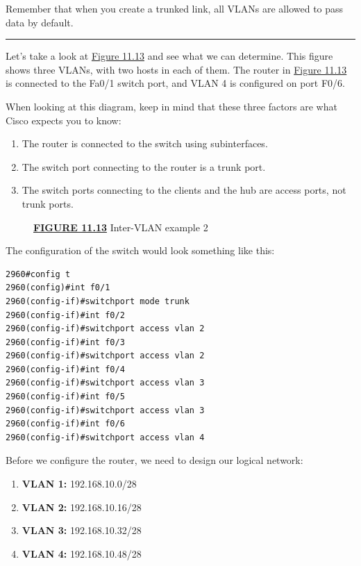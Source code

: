 \documentclass[b5paper,11pt]{memoir}
\begin{document}
Remember that when you create a trunked
link, all VLANs are allowed to pass data by default.

\begin{center}\rule{0.5\linewidth}{0.5pt}\end{center}

Let's take a look at
\protect\hyperlink{c11.xhtmlux5cux23figure11-13}{Figure 11.13} and see
what we can determine. This figure shows three VLANs, with two hosts in
each of them. The router in
\protect\hyperlink{c11.xhtmlux5cux23figure11-13}{Figure 11.13} is
connected to the Fa0/1 switch port, and VLAN 4 is configured on port
F0/6.

When looking at this diagram, keep in mind that these three factors are
what Cisco expects you to know:

\begin{enumerate}
\tightlist
\item
  The router is connected to the switch using subinterfaces.
\item
  The switch port connecting to the router is a trunk port.
\item
  The switch ports connecting to the clients and the hub are access
  ports, not trunk ports.
\end{enumerate}

\begin{figure}
\centering
\caption{{\protect\hyperlink{c11.xhtmlux5cux23figureanchor11-13}{\textbf{FIGURE
11.13}} Inter-VLAN example 2}}
\end{figure}

The configuration of the switch would look something like this:

\begin{verbatim}
2960#config t
2960(config)#int f0/1
2960(config-if)#switchport mode trunk
2960(config-if)#int f0/2
2960(config-if)#switchport access vlan 2
2960(config-if)#int f0/3
2960(config-if)#switchport access vlan 2
2960(config-if)#int f0/4
2960(config-if)#switchport access vlan 3
2960(config-if)#int f0/5
2960(config-if)#switchport access vlan 3
2960(config-if)#int f0/6
2960(config-if)#switchport access vlan 4
\end{verbatim}

Before we configure the router, we need to design our logical network:

\begin{enumerate}
\tightlist
\item
  \textbf{VLAN 1:} 192.168.10.0/28
\item
  \textbf{VLAN 2:} 192.168.10.16/28
\item
  \textbf{VLAN 3:} 192.168.10.32/28
\item
  \textbf{VLAN 4:} 192.168.10.48/28
\end{enumerate}
\end{document}
